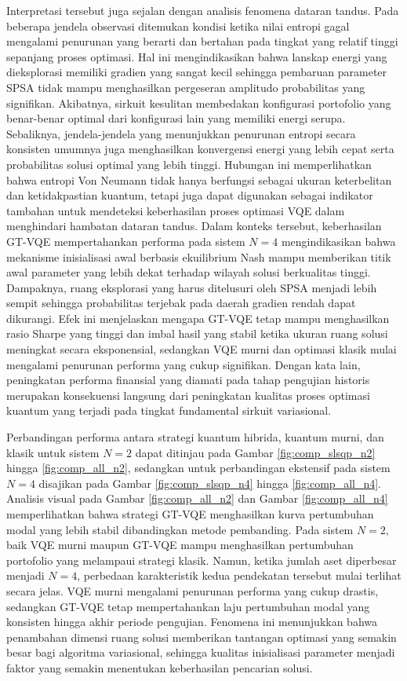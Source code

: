 Interpretasi tersebut juga sejalan dengan analisis fenomena dataran tandus. Pada beberapa jendela observasi ditemukan kondisi ketika nilai entropi gagal mengalami penurunan yang berarti dan bertahan pada tingkat yang relatif tinggi sepanjang proses optimasi. Hal ini mengindikasikan bahwa lanskap energi yang dieksplorasi memiliki gradien yang sangat kecil sehingga pembaruan parameter SPSA tidak mampu menghasilkan pergeseran amplitudo probabilitas yang signifikan. Akibatnya, sirkuit kesulitan membedakan konfigurasi portofolio yang benar-benar optimal dari konfigurasi lain yang memiliki energi serupa. Sebaliknya, jendela-jendela yang menunjukkan penurunan entropi secara konsisten umumnya juga menghasilkan konvergensi energi yang lebih cepat serta probabilitas solusi optimal yang lebih tinggi. Hubungan ini memperlihatkan bahwa entropi Von Neumann tidak hanya berfungsi sebagai ukuran keterbelitan dan ketidakpastian kuantum, tetapi juga dapat digunakan sebagai indikator tambahan untuk mendeteksi keberhasilan proses optimasi VQE dalam menghindari hambatan dataran tandus. Dalam konteks tersebut, keberhasilan GT-VQE mempertahankan performa pada sistem $N=4$ mengindikasikan bahwa mekanisme inisialisasi awal berbasis ekuilibrium Nash mampu memberikan titik awal parameter yang lebih dekat terhadap wilayah solusi berkualitas tinggi. Dampaknya, ruang eksplorasi yang harus ditelusuri oleh SPSA menjadi lebih sempit sehingga probabilitas terjebak pada daerah gradien rendah dapat dikurangi. Efek ini menjelaskan mengapa GT-VQE tetap mampu menghasilkan rasio Sharpe yang tinggi dan imbal hasil yang stabil ketika ukuran ruang solusi meningkat secara eksponensial, sedangkan VQE murni dan optimasi klasik mulai mengalami penurunan performa yang cukup signifikan. Dengan kata lain, peningkatan performa finansial yang diamati pada tahap pengujian historis merupakan konsekuensi langsung dari peningkatan kualitas proses optimasi kuantum yang terjadi pada tingkat fundamental sirkuit variasional. 

Perbandingan performa antara strategi kuantum hibrida, kuantum murni, dan klasik untuk sistem $N=2$ dapat ditinjau pada Gambar \ref{fig:comp_slsqp_n2} hingga \ref{fig:comp_all_n2}, sedangkan untuk perbandingan ekstensif pada sistem $N=4$ disajikan pada Gambar \ref{fig:comp_slsqp_n4} hingga \ref{fig:comp_all_n4}. Analisis visual pada Gambar \ref{fig:comp_all_n2} dan Gambar \ref{fig:comp_all_n4} memperlihatkan bahwa strategi GT-VQE menghasilkan kurva pertumbuhan modal yang lebih stabil dibandingkan metode pembanding. Pada sistem $N=2$, baik VQE murni maupun GT-VQE mampu menghasilkan pertumbuhan portofolio yang melampaui strategi klasik. Namun, ketika jumlah aset diperbesar menjadi $N=4$, perbedaan karakteristik kedua pendekatan tersebut mulai terlihat secara jelas. VQE murni mengalami penurunan performa yang cukup drastis, sedangkan GT-VQE tetap mempertahankan laju pertumbuhan modal yang konsisten hingga akhir periode pengujian. Fenomena ini menunjukkan bahwa penambahan dimensi ruang solusi memberikan tantangan optimasi yang semakin besar bagi algoritma variasional, sehingga kualitas inisialisasi parameter menjadi faktor yang semakin menentukan keberhasilan pencarian solusi.


